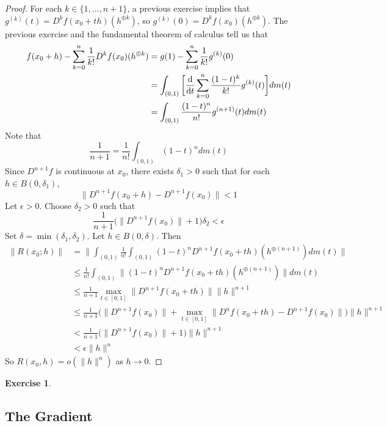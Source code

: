 \documentclass[12pt]{amsart}
\theoremstyle{definition}
\newtheorem{ex}[definition]{Exercise}
\newcommand{\del}{\delta}
\newcommand{\ep}{\epsilon}
\begin{document}
	\begin{proof}
	For each $k \in \{1, \dots, n+1\}$, a previous exercise implies that $g^{(k)}(t) = D^kf(x_0 + th)(h^{\oplus k})$, so $g^{(k)}(0) = D^kf(x_0)(h^{\oplus k})$. The previous exercise and the fundamental theorem of calculus tell us that 
	\begin{align*}
	f(x_0 +h) - \sum_{k=0}^{n} \frac{1}{k!}D^kf(x_0)(h^{\oplus k})
	&= g(1) - \sum_{k=0}^{n} \frac{1}{k!}g^{(k)}(0)\\
	&= \int_{(0,1)} \bigg [\dv{t} \sum_{k=0}^{n} \frac{(1-t)^k}{k!}g^{(k)}(t)\bigg ] dm(t) \\
	&= \int_{(0,1)} \frac{(1-t)^{n}}{n!}g^{(n+1)}(t) dm(t)
	\end{align*}	
	Note that $$\frac{1}{n+1} = \frac{1}{n!}\int_{(0,1)} (1-t)^{n} dm(t)$$ 
	Since $D^{n+1}f$ is continuous at $x_0$, there exists $\del_1 >0$ such that for each $h \in B(0, \del_1)$, 
	$$\|D^{n+1} f(x_0+h) - D^{n+1}f(x_0)\| < 1 $$  
	Let $\ep >0$. Choose $\del_2 >0$ such that $$\frac{1}{n+1} \bigg( \|D^{n+1}f(x_0 )\|  +  1 \bigg) \del_2 < \ep$$ Set $\del = \min(\del_1, \del_2)$. Let $h \in B(0, \del)$. Then
	\begin{align*}
	\|R(x_0;h)\| 
	&= \bigg \| \int_{(0,1)} \frac{1}{n!}\int_{(0,1)} (1-t)^{n}D^{n+1}f(x_0 + th)(h^{\oplus (n+1)})d m(t) \bigg\| \\
	&\leq \frac{1}{n!}\int_{(0,1)} \|(1-t)^{n}D^{n+1}f(x_0 + th)(h^{\oplus (n+1)}) \|dm(t)\\
	&\leq \frac{1}{n+1} \max_{t \in [0,1]}\|D^{n+1}f(x_0 + th)\| \|h\|^{n+1}  \\
	&\leq \frac{1}{n+1}  \bigg(\|D^{n+1}f(x_0 )\| +  \max_{t \in [0,1]} \|D^n f(x_0+th) - D^{n+1}f(x_0)\| \bigg)\|h\|^{n+1}  \\
	&< \frac{1}{n+1}\bigg(\|D^{n+1}f(x_0 )\|  +  1 \bigg)\|h\|^{n+1}  \\
	&<\ep \|h\|^n
	\end{align*}
	So $R(x_0, h) = o(\|h\|^{n})$ as $h \rightarrow 0$.
	\end{proof}
	
	\begin{ex}
	
	\end{ex}

	
	
	
	
	
	\newpage
	\subsection{The Gradient}
	
\end{document}

